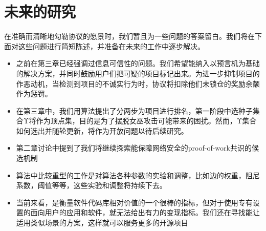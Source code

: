 \section{未来的研究}
\label{s:future-work}

在准确而清晰地勾勒\oscoin{}协议的愿景时，我们暂且为一些问题的答案留白。我们将在下面对这些问题进行简短陈述，并准备在未来的工作中逐步解决。

\begin{itemize}
\item 之前在第三章已经强调过信息可信性的问题。我们希望能纳入以预言机为基础的解决方案，并同时鼓励用户们把可疑的项目标记出来。为进一步抑制项目的作恶动机，当检测到项目的不诚实行为时，协议将扣除他们未锁仓的奖励余额作为惩罚。

\item 在第三章中，我们用\osrank{}算法提出了分两步为项目进行排名，第一阶段中选种子集合Υ将作为顶点集，目的是为了摆脱女巫攻击可能带来的困扰。然而，Υ集合如何选出并随轮更新，将作为开放问题以待后续研究。

\item 第二章讨论中提到了我们将继续探索能保障网络安全的proof-of-work共识的候选机制

\item \osrank{}算法中比较重型的工作是对算法各种参数的实验和调整，比如边的权重，阻尼系数，阈值等等，这些实验和调整将持续下去。

\item 当前来看，\osrank{}是衡量软件代码库相对价值的一个很棒的指标，但对于使用专有设置的面向用户的应用和软件，\osrank{}就无法给出有力的变现指标。我们还在寻找能让\osrank{}适用类似场景的方案，这样就可以服务更多的开源项目

\end{itemize}
